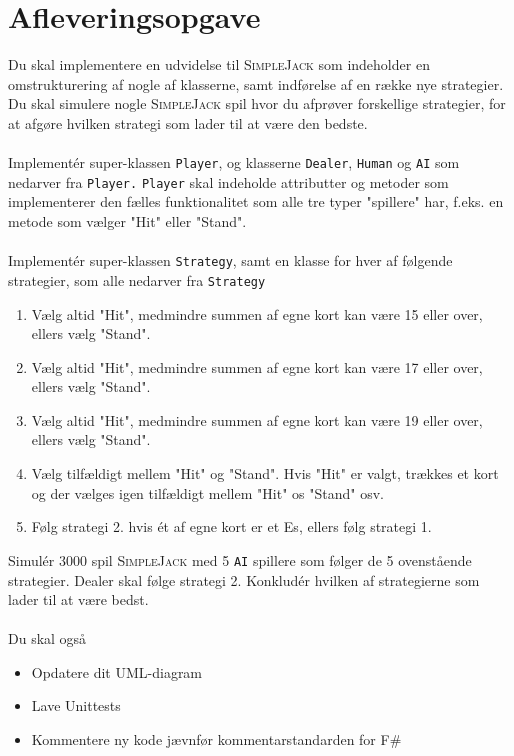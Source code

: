 \documentclass[12pt]{article}
\newcommand{\sbl}{\textsc{SimpleJack }}
\begin{document}
\section*{Afleveringsopgave}
Du skal implementere en udvidelse til \sbl som indeholder en omstrukturering af nogle af klasserne, samt indførelse
af en række nye strategier. Du skal simulere nogle \sbl spil hvor du afprøver forskellige strategier, for at afgøre
hvilken strategi som lader til at være den bedste. \\ \\
Implementér super-klassen \texttt{Player}, og klasserne \texttt{Dealer}, \texttt{Human} og \texttt{AI} som nedarver
fra \texttt{Player.} \texttt{Player} skal indeholde attributter og metoder som implementerer den fælles funktionalitet
som alle tre typer "spillere" har, f.eks. en metode som vælger "Hit" eller "Stand". \\ \\
Implementér super-klassen \texttt{Strategy}, samt en klasse for hver af følgende strategier, som alle nedarver fra
\texttt{Strategy}
\begin{enumerate}
\item Vælg altid "Hit", medmindre summen af egne kort kan være 15 eller over, ellers vælg "Stand".
\item Vælg altid "Hit", medmindre summen af egne kort kan være 17 eller over, ellers vælg "Stand".
\item Vælg altid "Hit", medmindre summen af egne kort kan være 19 eller over, ellers vælg "Stand".
\item Vælg tilfældigt mellem "Hit" og "Stand". Hvis "Hit" er valgt, trækkes et kort og der vælges igen tilfældigt mellem
"Hit" os "Stand" osv.
\item Følg strategi 2. hvis ét af egne kort er et Es, ellers følg strategi 1.
\end{enumerate}
Simulér 3000 spil \sbl med 5 \texttt{AI} spillere som følger de 5 ovenstående strategier.
Dealer skal følge strategi 2. 
Konkludér hvilken af strategierne som lader til at være bedst. \\ \\
Du skal også
\begin{itemize}
\item Opdatere dit UML-diagram
\item Lave Unittests
\item Kommentere ny kode jævnfør kommentarstandarden for F\#
\end{itemize}
\end{document}
